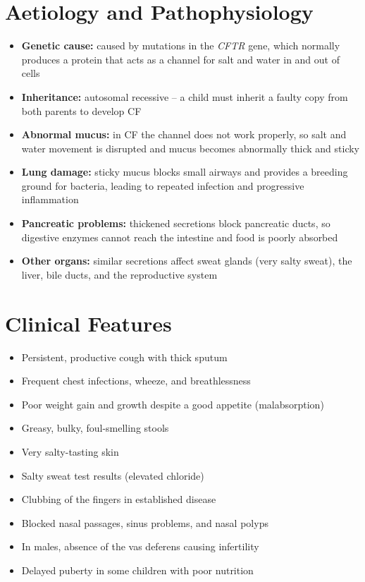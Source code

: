 \section*{Aetiology and Pathophysiology}
\begin{itemize}
    \item \textbf{Genetic cause:} caused by mutations in the \textit{CFTR} gene, which normally produces a protein that acts as a channel for salt and water in and out of cells
    \item \textbf{Inheritance:} autosomal recessive -- a child must inherit a faulty copy from both parents to develop CF
    \item \textbf{Abnormal mucus:} in CF the channel does not work properly, so salt and water movement is disrupted and mucus becomes abnormally thick and sticky
    \item \textbf{Lung damage:} sticky mucus blocks small airways and provides a breeding ground for bacteria, leading to repeated infection and progressive inflammation
    \item \textbf{Pancreatic problems:} thickened secretions block pancreatic ducts, so digestive enzymes cannot reach the intestine and food is poorly absorbed
    \item \textbf{Other organs:} similar secretions affect sweat glands (very salty sweat), the liver, bile ducts, and the reproductive system
\end{itemize}

\section*{Clinical Features}
\begin{itemize}
    \item Persistent, productive cough with thick sputum
    \item Frequent chest infections, wheeze, and breathlessness
    \item Poor weight gain and growth despite a good appetite (malabsorption)
    \item Greasy, bulky, foul-smelling stools
    \item Very salty-tasting skin
    \item Salty sweat test results (elevated chloride)
    \item Clubbing of the fingers in established disease
    \item Blocked nasal passages, sinus problems, and nasal polyps
    \item In males, absence of the vas deferens causing infertility
    \item Delayed puberty in some children with poor nutrition
\end{itemize}

